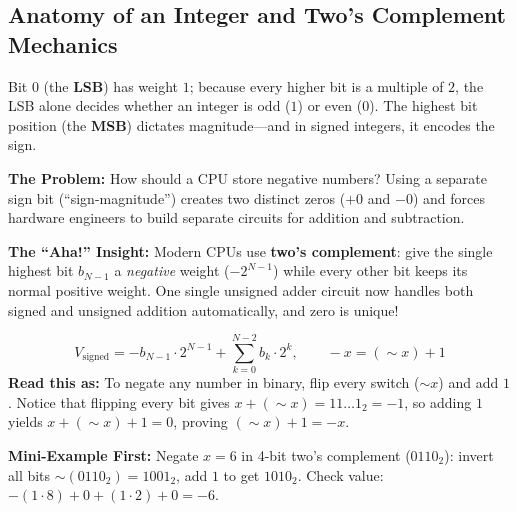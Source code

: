 \documentclass[11pt,a4paper]{article}
\theoremstyle{definition}
\newcommand{\painbeat}{\textbf{\color{accentamber}The Problem:} }
\newcommand{\ahabeat}{\textbf{\color{accentteal}The ``Aha!'' Insight:} }
\newcommand{\examplebeat}{\textbf{\color{primaryblue}Mini-Example First:} }
\begin{document}
\subsection{Anatomy of an Integer and Two's Complement Mechanics}

Bit $0$ (the \textbf{LSB}) has weight $1$; because every higher bit is a multiple of $2$, the LSB alone decides whether an integer is odd ($1$) or even ($0$). The highest bit position (the \textbf{MSB}) dictates magnitude---and in signed integers, it encodes the sign.

\painbeat How should a CPU store negative numbers? Using a separate sign bit (``sign-magnitude'') creates two distinct zeros ($+0$ and $-0$) and forces hardware engineers to build separate circuits for addition and subtraction.

\ahabeat Modern CPUs use \textbf{two's complement}: give the single highest bit $b_{N-1}$ a \emph{negative} weight ($-2^{N-1}$) while every other bit keeps its normal positive weight. One single unsigned adder circuit now handles both signed and unsigned addition automatically, and zero is unique!

\begin{formulabox}
$$V_{\text{signed}} = -b_{N-1} \cdot 2^{N-1} + \sum_{k=0}^{N-2} b_k \cdot 2^k, \qquad -x = (\sim x) + 1$$
\textbf{Read this as:} To negate any number in binary, flip every switch ($\sim x$) and add $1$. Notice that flipping every bit gives $x + (\sim x) = 11\dots1_2 = -1$, so adding $1$ yields $x + (\sim x) + 1 = 0$, proving $(\sim x) + 1 = -x$.
\end{formulabox}

\examplebeat Negate $x = 6$ in 4-bit two's complement ($0110_2$): invert all bits $\sim(0110_2) = 1001_2$, add $1$ to get $1010_2$. Check value: $-(1 \cdot 8) + 0 + (1 \cdot 2) + 0 = -6$.
\end{document}
